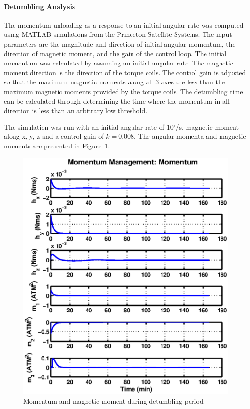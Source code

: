 \documentclass[12pt]{article}
\begin{document}
			\paragraph{Detumbling Analysis}
				The momentum unloading as a response to an initial angular rate was computed using MATLAB simulations from the Princeton Satellite Systems. The input parameters are the magnitude and direction of initial angular momentum, the direction of magnetic moment, and the gain of the control loop. The initial momentum was calculated by assuming an initial angular rate. The magnetic moment direction is the direction of the torque coils. The control gain is adjusted so that the maximum magnetic moments along all 3 axes are less than the maximum magnetic moments provided by the torque coils. The detumbling time can be calculated through determining the time where the momentum in all direction is less than an arbitrary low threshold. 

The simulation was run with an initial angular rate of 10$^\circ$/s, magnetic moment along x, y, z and a control gain of $k =0.008$. The angular momenta and magnetic moments are presented in Figure~\ref{fig:ADCS_detumbling}.

			\begin{figure}[!ht]
				\centering
				\includegraphics[scale=0.8]{images/ADCS_detumbling.eps}
				\caption{Momentum and magnetic moment during detumbling period}
				\label{fig:ADCS_detumbling}
			\end{figure}
\end{document}
